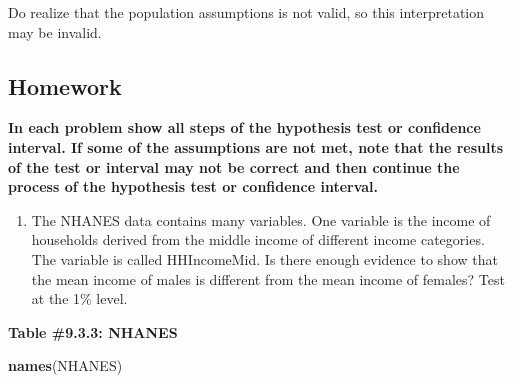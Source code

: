 \documentclass[]{book}
\newenvironment{Shaded}{\begin{snugshade}}{\end{snugshade}}
\newcommand{\KeywordTok}[1]{\textcolor[rgb]{0.13,0.29,0.53}{\textbf{#1}}}
\newcommand{\NormalTok}[1]{#1}
\providecommand{\tightlist}{%
  \setlength{\itemsep}{0pt}\setlength{\parskip}{0pt}}
\begin{document}
Do realize that the population assumptions is not valid, so this interpretation may be invalid.

\hypertarget{homework-28}{%
\subsection{Homework}\label{homework-28}}

\textbf{In each problem show all steps of the hypothesis test or confidence interval. If some of the assumptions are not met, note that the results of the test or interval may not be correct and then continue the process of the hypothesis test or confidence interval.}

\begin{enumerate}
\def\labelenumi{\arabic{enumi}.}
\tightlist
\item
  The NHANES data contains many variables. One variable is the income of households derived from the middle income of different income categories. The variable is called HHIncomeMid. Is there enough evidence to show that the mean income of males is different from the mean income of females? Test at the 1\% level.
\end{enumerate}

\textbf{Table \#9.3.3: NHANES}

\begin{Shaded}
\begin{Highlighting}[]
\KeywordTok{names}\NormalTok{(NHANES)}
\end{Highlighting}
\end{Shaded}
\end{document}
